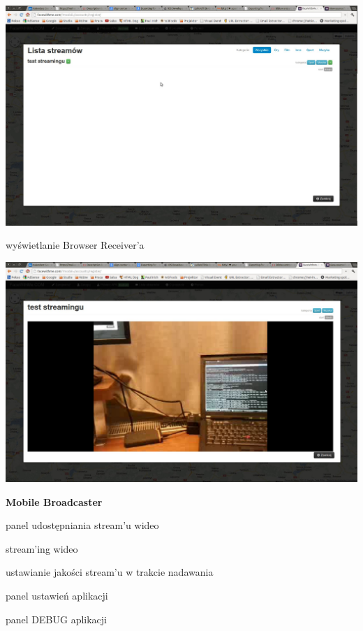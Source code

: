 \begin{packed_item}
{\begin{center}
            \includegraphics[width=\textwidth]{img/screens/interfejs_www/lista-streamow.jpg}
        \end{center}
    }
    \item{wyświetlanie Browser Receiver'a
        \begin{center}
            \includegraphics[width=\textwidth]{img/screens/interfejs_www/browser-receiver.jpg}
        \end{center}
    }
\end{packed_item}

\newpage
\textbf{Mobile Broadcaster}
\begin{packed_item}
    \item{panel udostępniania stream'u wideo}
    \item{stream'ing wideo}
    \item{ustawianie jakości stream'u w trakcie nadawania}
    \item{panel ustawień aplikacji}
    \item{panel DEBUG aplikacji}
\end{packed_item}

